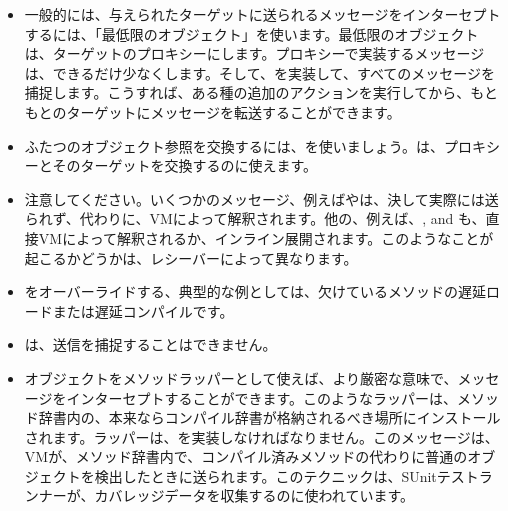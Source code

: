 \documentclass[a4paper,10pt,twoside]{book}
\begin{document}
\begin{itemize}
\item 一般的には、与えられたターゲットに送られるメッセージをインターセプトするには、「最低限のオブジェクト」を使います。最低限のオブジェクトは、ターゲットのプロキシーにします。プロキシーで実装するメッセージは、できるだけ少なくします。そして、を実装して、すべてのメッセージを捕捉します。こうすれば、ある種の追加のアクションを実行してから、もともとのターゲットにメッセージを転送することができます。
\item ふたつのオブジェクト参照を交換するには、を使いましょう。は、プロキシーとそのターゲットを交換するのに使えます。
\item 注意してください。いくつかのメッセージ、例えばやは、決して実際には送られず、代わりに、VMによって解釈されます。他の、例えば、\ct{+}, \ct{-} and  も、直接VMによって解釈されるか、インライン展開されます。このようなことが起こるかどうかは、レシーバーによって異なります。%
\item {}をオーバーライドする、典型的な例としては、欠けているメソッドの遅延ロードまたは遅延コンパイルです。
\item {}は、\self{}送信を捕捉することはできません。
\item オブジェクトをメソッドラッパーとして使えば、より厳密な意味で、メッセージをインターセプトすることができます。このようなラッパーは、メソッド辞書内の、本来ならコンパイル辞書が格納されるべき場所にインストールされます。ラッパーは、を実装しなければなりません。このメッセージは、VMが、メソッド辞書内で、コンパイル済みメソッドの代わりに普通のオブジェクトを検出したときに送られます。このテクニックは、SUnitテストランナーが、カバレッジデータを収集するのに使われています。%
\end{itemize}

\ifx\wholebook\relax\else
   
   
\end{document}
